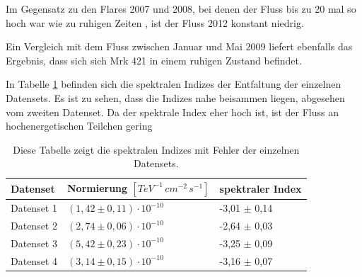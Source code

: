 Im Gegensatz zu den Flares 2007 und 2008, bei denen der Fluss bis zu 20 mal so hoch war wie zu ruhigen Zeiten \cite{DissBackes}, ist der Fluss 2012 konstant niedrig.

Ein Vergleich mit dem Fluss zwischen Januar und Mai 2009 \cite{DissDiego} liefert ebenfalls das Ergebnis, dass sich sich Mrk 421 in einem ruhigen Zustand befindet.

In Tabelle \ref{tab:SpektraleIndizes} befinden sich die spektralen Indizes der Entfaltung der einzelnen Datensets.
Es ist zu sehen, dass die Indizes nahe beisammen liegen, abgesehen vom zweiten Datenset.
Da der spektrale Index eher hoch ist, ist der Fluss an hochenergetischen Teilchen gering

\begin{table}[!h]
\centering
\caption{Diese Tabelle zeigt die spektralen Indizes mit Fehler der einzelnen Datensets.}
\label{tab:SpektraleIndizes}
\begin{tabular}{lll}
  \toprule
  Datenset & Normierung $\left[\si{TeV^{-1}\,cm^{-2}\,s^{-1}}\right]$ & spektraler Index\\
  \midrule
  \midrule
Datenset 1 & $(1,42\pm 0,11)\cdot 10^{-10}$ & -3,01 $\pm$ 0,14 \\
Datenset 2 & $(2,74\pm 0,06)\cdot 10^{-10}$ & -2,64 $\pm$ 0,03 \\
Datenset 3 & $(5,42\pm 0,23)\cdot 10^{-10}$ & -3,25 $\pm$ 0,09 \\
Datenset 4 & $(3,14\pm 0,15)\cdot 10^{-10}$ & -3,16 $\pm$ 0,07 \\
  \bottomrule
\end{tabular}
\end{table}

